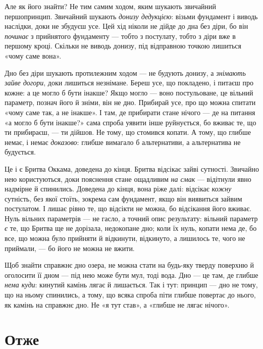 \documentclass[12pt, a4paper, openany]{book}
\begin{document}
Але як його знайти? Не тим самим ходом, яким шукають звичайний першопринцип. Звичайний шукають \emph{донизу дедукцією}: візьми фундамент і виводь наслідки, доки не збудуєш усе. Цей хід ніколи не дійде до дна без діри, бо він \emph{починає} з прийнятого фундаменту --- тобто з постулату, тобто з діри вже в першому кроці. Скільки не виводь донизу, під відправною точкою лишиться «чому саме вона».

Дно без діри шукають протилежним ходом --- не будують донизу, а \emph{знімають зайве догори}, доки лишиться незнімане. Береш усе, що покладено, і питаєш про кожне: а це могло б бути інакше? Якщо могло --- воно постульоване, це вільний параметр, познач його й зніми, він не дно. Прибирай усе, про що можна спитати «чому саме так, а не інакше». І там, де прибирати стане нічого --- де на питання «а могло б бути інакше?» сама спроба уявити інше руйнується, бо вживає те, що ти прибираєш, --- ти дійшов. Не тому, що стомився копати. А тому, що глибше немає, і немає \emph{доказово}: глибше вимагало б альтернативи, а альтернатива не будується.

Це і є Бритва Оккама, доведена до кінця. Бритва відсікає зайві сутності. Звичайно нею користуються, доки пояснення стане ощадливим \emph{на смак} --- відітнули явно надмірне й спинились. Доведена до кінця, вона ріже далі: відсікає \emph{кожну} сутність, без якої стоїть, зокрема сам фундамент, якщо він виявиться зайвим постулатом. І лишає рівно те, що відсікти не можна, бо відсікання його вживає. Нуль вільних параметрів --- не гасло, а точний опис результату: вільний параметр \emph{є} те, що Бритва ще не дорізала, недокопане дно; коли їх нуль, копати нема де, бо все, що можна було прийняти й відкинути, відкинуто, а лишилось те, чого не приймали, --- бо його не можна не вжити.

\begin{analogybox}
Щоб знайти справжнє дно озера, не можна стати на будь-яку тверду поверхню й оголосити її дном --- під нею може бути мул, тоді вода. Дно --- це там, де глибше \emph{нема куди}: кинутий камінь лягає й лишається. Так і тут: принцип --- дно не тому, що на ньому спинились, а тому, що всяка спроба піти глибше повертає до нього, як камінь на справжнє дно. Не «я тут став», а «глибше не лягає нічого».
\end{analogybox}

\section{Отже}
\end{document}
